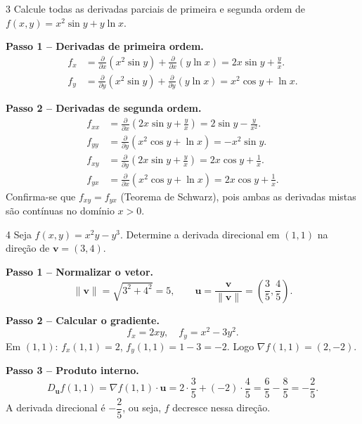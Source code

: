 \begin{exercisebox}{3}
  Calcule todas as derivadas parciais de primeira e segunda ordem de
  $f(x,y) = x^2\sin y + y\ln x$.
\end{exercisebox}
\begin{solbox}
  \textbf{Passo 1 -- Derivadas de primeira ordem.}
  \begin{align*}
    f_x &= \frac{\partial}{\partial x}(x^2\sin y) + \frac{\partial}{\partial x}(y\ln x)
         = 2x\sin y + \frac{y}{x}.\\[4pt]
    f_y &= \frac{\partial}{\partial y}(x^2\sin y) + \frac{\partial}{\partial y}(y\ln x)
         = x^2\cos y + \ln x.
  \end{align*}

  \textbf{Passo 2 -- Derivadas de segunda ordem.}
  \begin{align*}
    f_{xx} &= \frac{\partial}{\partial x}\!\left(2x\sin y+\frac{y}{x}\right)
            = 2\sin y - \frac{y}{x^2}.\\[4pt]
    f_{yy} &= \frac{\partial}{\partial y}(x^2\cos y+\ln x)
            = -x^2\sin y.\\[4pt]
    f_{xy} &= \frac{\partial}{\partial y}\!\left(2x\sin y+\frac{y}{x}\right)
            = 2x\cos y + \frac{1}{x}.\\[4pt]
    f_{yx} &= \frac{\partial}{\partial x}(x^2\cos y+\ln x)
            = 2x\cos y + \frac{1}{x}.
  \end{align*}
  Confirma-se que $f_{xy}=f_{yx}$ (Teorema de Schwarz), pois ambas as
  derivadas mistas são contínuas no domínio $x>0$.
\end{solbox}

\begin{exercisebox}{4}
  Seja $f(x,y) = x^2 y - y^3$. Determine a derivada direcional em $(1,1)$
  na direção de $\mathbf{v}=(3,4)$.
\end{exercisebox}
\begin{solbox}
  \textbf{Passo 1 -- Normalizar o vetor.}
  \[
    \|\mathbf{v}\| = \sqrt{3^2+4^2} = 5,\qquad
    \mathbf{u} = \frac{\mathbf{v}}{\|\mathbf{v}\|} = \left(\frac{3}{5},\frac{4}{5}\right).
  \]

  \textbf{Passo 2 -- Calcular o gradiente.}
  \[
    f_x = 2xy,\quad f_y = x^2 - 3y^2.
  \]
  Em $(1,1)$: $f_x(1,1)=2$, $f_y(1,1)=1-3=-2$.
  Logo $\nabla f(1,1)=(2,-2)$.

  \textbf{Passo 3 -- Produto interno.}
  \[
    D_{\mathbf{u}}f(1,1) = \nabla f(1,1)\cdot\mathbf{u}
    = 2\cdot\frac{3}{5}+(-2)\cdot\frac{4}{5}
    = \frac{6}{5}-\frac{8}{5} = -\frac{2}{5}.
  \]
  A derivada direcional é $-\dfrac{2}{5}$, ou seja, $f$ decresce nessa
  direção.
\end{solbox}

